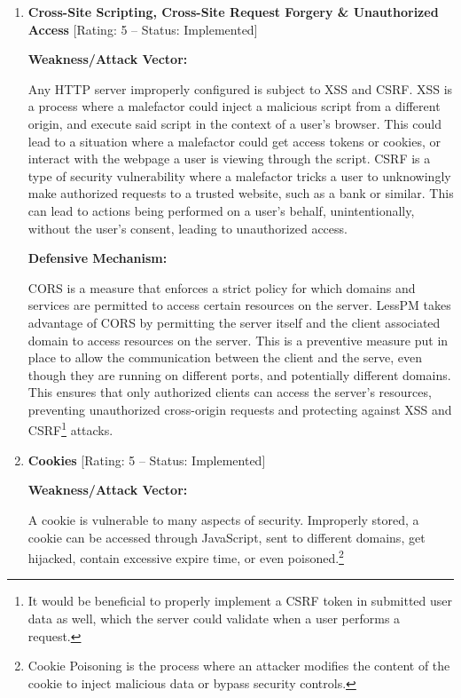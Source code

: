 \begin{enumerate}[label=$\blacktriangleright$]
  \item \textbf{
    Cross-Site Scripting,
    Cross-Site Request Forgery
    \& Unauthorized Access} [Rating: 5 -- Status: Implemented]

  \textbf{Weakness/Attack Vector:}

  Any HTTP server improperly configured is subject to XSS and CSRF\@.
  XSS is a process where a malefactor could inject a malicious script from a
  different origin, and execute said script in the context of a user's browser.
  This could lead to a situation where a malefactor could get access tokens
  or cookies, or interact with the webpage a user is viewing through the
  script.
  CSRF is a type of security vulnerability where a malefactor tricks a user
  to unknowingly make authorized requests to a trusted website, such as a
  bank or similar.
  This can lead to actions being performed on a user's behalf, unintentionally,
  without the user's consent, leading to unauthorized access.

  \textbf{Defensive Mechanism:}

  CORS is a measure that enforces a strict policy for which domains and services
  are permitted to access certain resources on the server.
  LessPM takes advantage of CORS by permitting the server itself and the
  client associated domain to access resources on the server.
  This is a preventive measure put in place to allow the communication
  between the client and the serve, even though they are running on different
  ports, and potentially different domains.
  This ensures that only authorized clients can access the server's resources,
  preventing unauthorized cross-origin requests and protecting against XSS and
  CSRF\footnote{
    It would be beneficial to properly implement a CSRF token in submitted
    user data as well, which the server could validate when a user performs a
    request.
  } attacks.

  \item \textbf{Cookies} [Rating: 5 -- Status: Implemented]

  \textbf{Weakness/Attack Vector:}

  A cookie is vulnerable to many aspects of security.
  Improperly stored, a cookie can be accessed through JavaScript, sent to
  different domains, get hijacked, contain excessive expire time, or even
  poisoned.\footnote{
    Cookie Poisoning is the process where an attacker modifies the content of
    the cookie to inject malicious data or bypass security controls.
  }


\end{enumerate}

